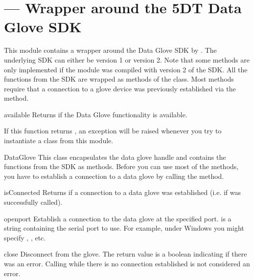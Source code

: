 \section{ ---
          Wrapper around the 5DT Data Glove SDK}


This module contains a wrapper around the Data Glove SDK by
. The underlying
SDK can either be version 1 or version 2. Note that some methods are
only implemented if the module was compiled with version 2 of the SDK.
All the functions from the SDK are wrapped as methods of the 
 class. Most methods require that a connection to
a glove device was previously established via the  method.

\begin{funcdesc}{available}{}
Returns  if the Data Glove functionality is available. 

If this function returns , an exception will be raised
whenever you try to instantiate a class from this module.
\end{funcdesc}


\begin{classdesc}{DataGlove}{}
This class encapsulates the data glove handle and contains the
functions from the SDK as methods. Before you can use most of
the methods, you have to establish a connection to a data glove
by calling the  method.
\end{classdesc}

\begin{methoddesc}{isConnected}{}
Returns  if a connection to a data glove was established (i.e.
if  was successfully called).
\end{methoddesc}

\begin{methoddesc}{open}{port}
Establish a connection to the data glove at the specified port. 
is a string containing the serial port to use. For example, under Windows
you might specify , , etc.
\end{methoddesc}

\begin{methoddesc}{close}{}
Disconnect from the glove. The return value is a boolean indicating
if there was an error. Calling  while there is no
connection established is not considered an error.
\end{methoddesc}


